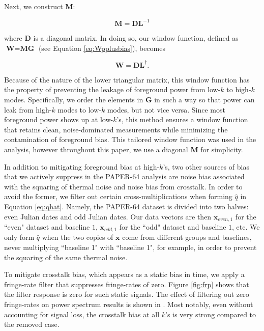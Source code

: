 \documentclass[preprint2,numberedappendix,tighten]{aastex6}  %
\begin{document}
\noindent Next, we construct $\textbf{M}$:

\begin{equation}
\textbf{M} = \textbf{DL}^{-1}
\end{equation}

\noindent where $\textbf{D}$ is a diagonal matrix. In doing so, our window function, defined as $\textbf{W} = \textbf{MG}$ (see Equation \eqref{eq:Wpplusbias}), 
becomes

\begin{equation}
\textbf{W} = \textbf{DL}^{\dagger}.
\end{equation}

\noindent Because of the nature of the lower triangular matrix, this window function has the property of preventing the leakage 
of foreground power from low-$k$ to high-$k$ modes. Specifically, we order the elements in $\textbf{G}$ in such a way so that 
power can leak from high-$k$ modes to low-$k$ modes, but not vice versa. Since most foreground power shows up at low-$k$'s, this method ensures a window function that retains clean, noise-dominated measurements while minimizing the 
contamination of foreground bias. This tailored window function was used in the  analysis, however throughout this paper, we use a diagonal $\textbf{M}$ for simplicity.

In addition to mitigating foreground bias at high-$k$'s, two other sources of bias that we actively suppress in the PAPER-64 
analysis are noise bias associated with the squaring of thermal noise and noise bias from crosstalk. In order to avoid the 
former, we filter out certain cross-multiplications when forming $\widehat{q}$ in Equation \eqref{eq:qhat}. Namely, the PAPER-64 
dataset is divided into two halves: even Julian dates and odd Julian dates. Our data vectors are then $\textbf{x}_{even, 1}$ for 
the ``even" dataset and baseline $1$, $\textbf{x}_{odd, 1}$ for the ``odd" dataset and baseline $1$, etc. We only form 
$\widehat{q}$ when the two copies of $\textbf{x}$ come from different groups and baselines, never multiplying ``baseline 1" with ``baseline 1", for 
example, in order to prevent the squaring of the same thermal noise. 

To mitigate crosstalk bias, which appears as a static bias in time, we apply a fringe-rate filter that suppresses fringe-rates of 
zero. Figure \ref{fig:frp} shows that the filter response is zero for such static signals. The effect of filtering out zero fringe-rates 
on power spectrum results is shown in . Most notably, even without accounting for signal loss, the crosstalk bias at all $k$'s is very strong compared to the removed case.
\end{document}
